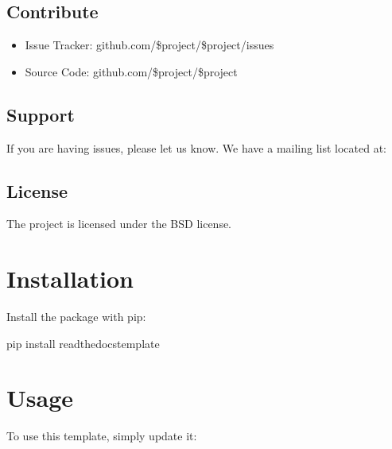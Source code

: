 \documentclass[letterpaper,10pt,english]{sphinxmanual}
\begin{document}
\section{Contribute}
\label{\detokenize{README:contribute}}\begin{itemize}
\item {} 
\sphinxAtStartPar
Issue Tracker: github.com/\$project/\$project/issues

\item {} 
\sphinxAtStartPar
Source Code: github.com/\$project/\$project

\end{itemize}


\section{Support}
\label{\detokenize{README:support}}
\sphinxAtStartPar
If you are having issues, please let us know.
We have a mailing list located at: 


\section{License}
\label{\detokenize{README:license}}
\sphinxAtStartPar
The project is licensed under the BSD license.

\sphinxstepscope

\sphinxstepscope

\sphinxstepscope

\sphinxstepscope


\chapter{Installation}
\label{\detokenize{installation:installation}}\label{\detokenize{installation::doc}}
\sphinxAtStartPar
Install the package with pip:

\begin{sphinxVerbatim}[commandchars=\\\{\}]
\PYGZdl{} pip install read\PYGZhy{}the\PYGZhy{}docs\PYGZhy{}template
\end{sphinxVerbatim}

\sphinxstepscope

\sphinxstepscope


\chapter{Usage}
\label{\detokenize{usage:usage}}\label{\detokenize{usage::doc}}
\sphinxAtStartPar
To use this template, simply update it:
\end{document}
